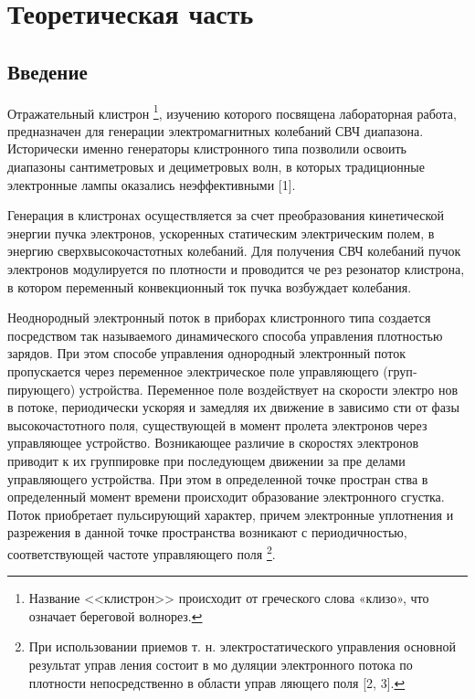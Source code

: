 
\usepackage{gensymb}
\usepackage{textcomp}
\usepackage{pythontex}


\def\labauthors{Карусевич А.А, Понур К.А.}
\def\labgroup{430}
\def\department{Кафедра электродинамики}
\def\labnumber{1}
\def\labtheme{Исследование отражательного клистрона}

\renewcommand{\Re}{\operatorname{Re}}
\renewcommand{\Im}{\operatorname{Im}}
\renewcommand{\phi}{\varphi}
\renewcommand{\hat}{\widehat}


\tableofcontents

\section{Теоретическая часть}

\subsection*{Введение}

Отражательный клистрон
\footnote{Название <<клистрон>> происходит от греческого слова «клизо», что означает береговой волнорез.}, 
изучению которого посвящена лабораторная работа, предназначен для генерации электромагнитных колебаний СВЧ диапазона. Исторически именно генераторы клистронного типа позволили освоить диапазоны сантиметровых и дециметровых волн, в которых традицион­ные электронные лампы оказались неэффективными [1].

Генерация в клистронах осуществляется за счет преобразования кинетической энергии пучка электронов, ускоренных статическим электрическим полем, в энергию сверхвысокочастотных колебаний. Для получения СВЧ колебаний пучок электронов модулируется по плотности и проводится че­ рез резонатор клистрона, в котором переменный конвекционный ток пучка возбуждает колебания.

Неоднородный электронный поток в приборах клистронного типа созда­ется посредством так называемого динамического способа управления плот­ностью зарядов. При этом способе управления однородный электронный по­ток пропускается через переменное электрическое поле управляющего 
(груп­пирующего) устройства. Переменное поле воздействует на скорости электро­
нов в потоке, периодически ускоряя и замедляя их движение в зависимо­
сти от фазы высокочастотного поля, существующей в момент пролета элек­тронов через управляющее устройство. Возникающее различие в скоростях
электронов приводит к их группировке при последующем движении за пре­
делами управляющего устройства. При этом в определенной точке простран­
ства в определенный момент времени происходит образование электронного
сгустка. Поток приобретает пульсирующий характер, причем электронные
уплотнения и разрежения в данной точке пространства возникают с перио­дичностью, соответствующей частоте управляющего поля
\footnote{При использовании приемов т. н. электростатического управления основной результат управ­
ления состоит в мо дуляции электронного потока по плотности непосредственно в области управ­
ляющего поля [2, 3].}.

